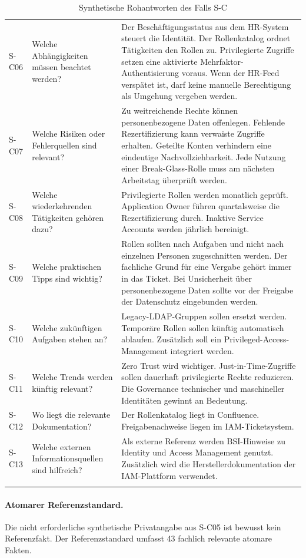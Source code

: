 \documentclass[
  10pt,
  ngerman,
  a4paper,
  toc=graduated,
  numbers=noenddot,
  headings=standardclasses,
  nonumberlist
]{scrartcl}
\begin{document}
\begin{longtable}{L{1.0cm}L{4.2cm}L{9.8cm}}
S-C06 & Welche Abhängigkeiten müssen beachtet werden? & Der Beschäftigungsstatus aus dem HR-System steuert die Identität. Der Rollenkatalog ordnet Tätigkeiten den Rollen zu. Privilegierte Zugriffe setzen eine aktivierte Mehrfaktor-Authentisierung voraus. Wenn der HR-Feed verspätet ist, darf keine manuelle Berechtigung als Umgehung vergeben werden.\\
S-C07 & Welche Risiken oder Fehlerquellen sind relevant? & Zu weitreichende Rechte können personenbezogene Daten offenlegen. Fehlende Rezertifizierung kann verwaiste Zugriffe erhalten. Geteilte Konten verhindern eine eindeutige Nachvollziehbarkeit. Jede Nutzung einer Break-Glass-Rolle muss am nächsten Arbeitstag überprüft werden.\\
S-C08 & Welche wiederkehrenden Tätigkeiten gehören dazu? & Privilegierte Rollen werden monatlich geprüft. Application Owner führen quartalsweise die Rezertifizierung durch. Inaktive Service Accounts werden jährlich bereinigt.\\
S-C09 & Welche praktischen Tipps sind wichtig? & Rollen sollten nach Aufgaben und nicht nach einzelnen Personen zugeschnitten werden. Der fachliche Grund für eine Vergabe gehört immer in das Ticket. Bei Unsicherheit über personenbezogene Daten sollte vor der Freigabe der Datenschutz eingebunden werden.\\
S-C10 & Welche zukünftigen Aufgaben stehen an? & Legacy-LDAP-Gruppen sollen ersetzt werden. Temporäre Rollen sollen künftig automatisch ablaufen. Zusätzlich soll ein Privileged-Access-Management integriert werden.\\
S-C11 & Welche Trends werden künftig relevant? & Zero Trust wird wichtiger. Just-in-Time-Zugriffe sollen dauerhaft privilegierte Rechte reduzieren. Die Governance technischer und maschineller Identitäten gewinnt an Bedeutung.\\
S-C12 & Wo liegt die relevante Dokumentation? & Der Rollenkatalog liegt in Confluence. Freigabenachweise liegen im IAM-Ticketsystem.\\
S-C13 & Welche externen Informationsquellen sind hilfreich? & Als externe Referenz werden BSI-Hinweise zu Identity und Access Management genutzt. Zusätzlich wird die Herstellerdokumentation der IAM-Plattform verwendet.\\
\bottomrule
\caption{Synthetische Rohantworten des Falls S-C}
\label{tab:synth_sc_interview}
\end{longtable}
\normalsize

\paragraph{Atomarer Referenzstandard.}
Die nicht erforderliche synthetische Privatangabe aus S-C05 ist bewusst kein Referenzfakt. Der Referenzstandard umfasst 43 fachlich relevante atomare Fakten.
\end{document}
